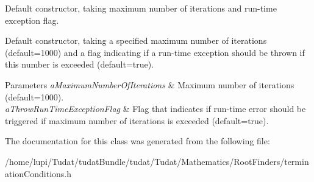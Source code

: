Default constructor, taking maximum number of iterations and run-\/time exception flag. 

Default constructor, taking a specified maximum number of iterations (default=1000) and a flag indicating if a run-\/time exception should be thrown if this number is exceeded (default=true). 
\begin{DoxyParams}{Parameters}
{\em a\+Maximum\+Number\+Of\+Iterations} & Maximum number of iterations (default=1000). \\
\hline
{\em a\+Throw\+Run\+Time\+Exception\+Flag} & Flag that indicates if run-\/time error should be triggered if maximum number of iterations is exceeded (default=true). \\
\hline
\end{DoxyParams}


The documentation for this class was generated from the following file\+:\begin{DoxyCompactItemize}
\item 
/home/lupi/\+Tudat/tudat\+Bundle/tudat/\+Tudat/\+Mathematics/\+Root\+Finders/termination\+Conditions.\+h\end{DoxyCompactItemize}
